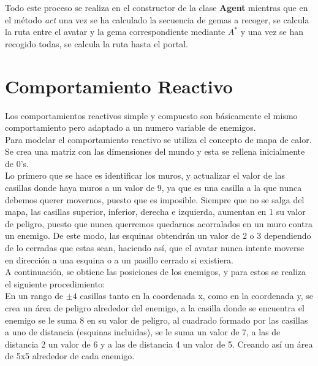 Todo este proceso se realiza en el constructor de la clase \textbf{Agent} mientras que en el método \emph{act} una vez se ha calculado la secuencia de gemas a recoger, se calcula la ruta entre el avatar y la gema correspondiente mediante $ A^{*} $ y una vez se han recogido todas, se calcula la ruta hasta el portal.


\newpage
\chapter{Comportamiento Reactivo}
Los comportamientos reactivos simple y compuesto son básicamente el mismo comportamiento pero adaptado a un numero variable de enemigos.\\

Para modelar el comportamiento reactivo se utiliza el concepto de mapa de calor.\\
Se crea una matriz con las dimensiones del mundo y esta se rellena inicialmente de 0's.\\
Lo primero que se hace es identificar los muros, y actualizar el valor de las casillas donde haya muros a un valor de 9, ya que es una casilla a la que nunca debemos querer movernos, puesto que es imposible. Siempre que no se salga del mapa, las casillas superior, inferior, derecha e izquierda, aumentan en 1 su valor de peligro, puesto que nunca querremos quedarnos acorralados en un muro contra un enemigo. De este modo, las esquinas obtendrán un valor de 2 o 3 dependiendo de lo cerradas que estas sean, haciendo así, que el avatar nunca intente moverse en dirección a una esquina o a un pasillo cerrado si existiera.\\
A continuación, se obtiene las posiciones de los enemigos, y para estos se realiza el siguiente procedimiento: \\
En un rango de $\pm 4$ casillas tanto en la coordenada x, como en la coordenada y, se crea un área de peligro alrededor del enemigo, a la casilla donde se encuentra el enemigo se le suma 8 en su valor de peligro, al cuadrado formado por las casillas a uno de distancia (esquinas incluidas), se le suma un valor de 7, a las de distancia 2 un valor de 6 y a las de distancia 4 un valor de 5. Creando así un área de 5x5 alrededor de cada enemigo.\\

